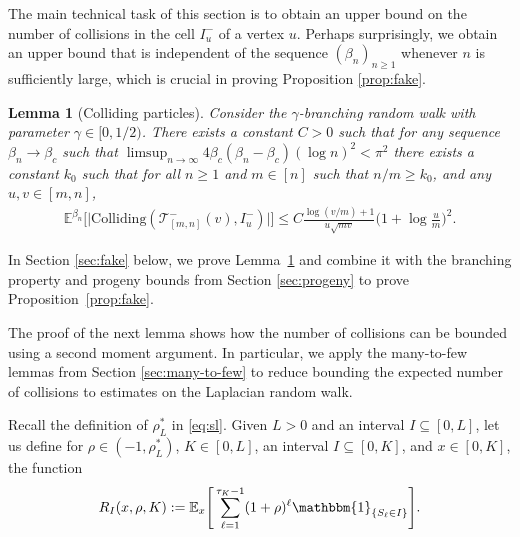 \documentclass[a4paper, a4wide, 10pt, reqno]{amsart}
\theoremstyle{plain}
\newtheorem{lemma}[theorem]{Lemma}
\theoremstyle{definition}
\numberwithin{equation}{section}
\newcommand{\E}{\mathbb E}
\newcommand{\sT}{{\mathscr T}}
\newcommand{\ind}[1]{\mathbbm{1}_{\{#1\}}}
\begin{document}
The main technical task of this section is to obtain an upper bound on the number of collisions in the cell $I_u^-$ of a vertex $u$.  Perhaps surprisingly, we obtain an upper bound that is independent of the sequence $(\beta_n)_{n\ge 1}$ whenever $n$ is sufficiently large, which is crucial in proving Proposition \ref{prop:fake}. 
\begin{lemma}[Colliding particles]\label{lem:coll}
Consider the $\gamma$-branching random walk with parameter $\gamma\in[0, 1/2)$. There exists a constant $C>0$ such that for any sequence $\beta_n\to\beta_c$ such that $\limsup_{n\to\infty}4\beta_c(\beta_n-\beta_c)(\log n)^2<\pi^2$ there exists a constant $k_0$  such that for all $n\ge 1$ and $m\in[n]$ such that $n/m\ge k_0$, and any $u, v\in[m,n]$,
    \begin{equation}
    \begin{aligned}
        \E^{\beta_n}\Big[\big|\mathrm{Colliding}(\sT_{[m,n]}^-(v), I_u^-)\big|\Big] 
        \le C\frac{\log(v/m)+1}{u\sqrt{mv}}\bigg(1+\log \frac{u}{m}\bigg)^2.  
        \end{aligned}
    \end{equation}
\end{lemma}
In Section \ref{sec:fake} below, we prove Lemma~\ref{lem:coll} and combine it
with the branching property and  progeny bounds from Section \ref{sec:progeny} to prove Proposition~\ref{prop:fake}. \smallskip 

The 
proof of the next lemma shows how the number of collisions can be bounded using a second moment argument. In particular, we apply the many-to-few lemmas from Section \ref{sec:many-to-few} to reduce bounding the expected number of collisions to estimates on the Laplacian random walk.

\smallskip 
Recall the definition of $\rho_L^*$ in \eqref{eq:sl}. Given $L>0$ and an interval $I\subseteq[0,L]$, let us define for $\rho\in(-1, \rho_L^*)$, $K\in[0, L]$, an interval $I\subseteq[0,K]$, and $x\in[0,K]$, the function 
\begin{equation}\label{eq:R}
    R_I(x, \rho, K):=\E_x\Bigg[\sum_{\ell=1}^{\tau_K-1}(1+\rho)^\ell\ind{S_\ell\in I}\Bigg].
\end{equation}
\end{document}

